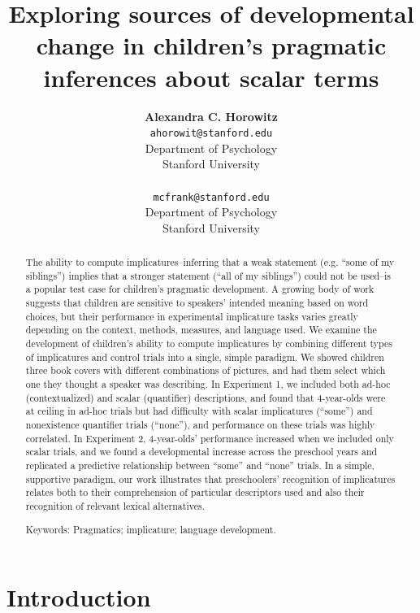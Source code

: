 \documentclass[10pt,letterpaper]{article}
\title{Exploring sources of developmental change in children's pragmatic inferences about scalar terms}
\author{{\large \bf Alexandra C. Horowitz} \\ \texttt{ahorowit@stanford.edu}\\ Department of Psychology \\ Stanford University \\ 
\And {\large \bf Michael C. Frank} \\ \texttt{mcfrank@stanford.edu} \\ Department of Psychology \\ Stanford University \\ }
\begin{document}
\maketitle

\begin{abstract} 

The ability to compute implicatures--inferring that a weak statement (e.g. ``some of my siblings'') implies that a stronger statement (``all of my siblings'') could not be used--is a popular test case for children's pragmatic development. A growing body of work suggests that children are sensitive to speakers' intended meaning based on word choices, but their performance in experimental implicature tasks varies greatly depending on the context, methods, measures, and language used. We examine the development of children's ability to compute implicatures by combining different types of implicatures and control trials into a single, simple paradigm. We showed children three book covers with different combinations of pictures, and had them select which one they thought a speaker was describing. In Experiment 1, we included both ad-hoc (contextualized) and scalar (quantifier) descriptions, and found that 4-year-olds were at ceiling in ad-hoc trials but had difficulty with scalar implicatures (``some'') and nonexistence quantifier trials (``none''), and performance on these trials was highly correlated.  In Experiment 2, 4-year-olds' performance increased when we included only scalar trials, and we found a developmental increase across the preschool years and replicated a predictive relationship between ``some'' and ``none'' trials. In a simple, supportive paradigm, our work illustrates that preschoolers' recognition of implicatures relates both to their comprehension of particular descriptors used and also their recognition of relevant lexical alternatives. 




{Keywords:} Pragmatics; implicature; language development. 
\end{abstract}

\section{Introduction}
\end{document}
